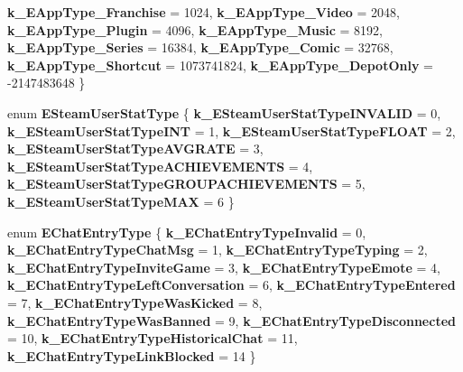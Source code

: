 \begin{DoxyCompactItemize}
{\bfseries k\+\_\+\+E\+App\+Type\+\_\+\+Franchise} = 1024, 
\newline
{\bfseries k\+\_\+\+E\+App\+Type\+\_\+\+Video} = 2048, 
{\bfseries k\+\_\+\+E\+App\+Type\+\_\+\+Plugin} = 4096, 
{\bfseries k\+\_\+\+E\+App\+Type\+\_\+\+Music} = 8192, 
{\bfseries k\+\_\+\+E\+App\+Type\+\_\+\+Series} = 16384, 
\newline
{\bfseries k\+\_\+\+E\+App\+Type\+\_\+\+Comic} = 32768, 
{\bfseries k\+\_\+\+E\+App\+Type\+\_\+\+Shortcut} = 1073741824, 
{\bfseries k\+\_\+\+E\+App\+Type\+\_\+\+Depot\+Only} = -\/2147483648
 \}
\item 
\mbox{\label{namespace_valve_1_1_steamworks_a15b38f5cd07e677a2e5bf2527fb6b562}} 
enum {\bfseries E\+Steam\+User\+Stat\+Type} \{ \newline
{\bfseries k\+\_\+\+E\+Steam\+User\+Stat\+Type\+I\+N\+V\+A\+L\+ID} = 0, 
{\bfseries k\+\_\+\+E\+Steam\+User\+Stat\+Type\+I\+NT} = 1, 
{\bfseries k\+\_\+\+E\+Steam\+User\+Stat\+Type\+F\+L\+O\+AT} = 2, 
{\bfseries k\+\_\+\+E\+Steam\+User\+Stat\+Type\+A\+V\+G\+R\+A\+TE} = 3, 
\newline
{\bfseries k\+\_\+\+E\+Steam\+User\+Stat\+Type\+A\+C\+H\+I\+E\+V\+E\+M\+E\+N\+TS} = 4, 
{\bfseries k\+\_\+\+E\+Steam\+User\+Stat\+Type\+G\+R\+O\+U\+P\+A\+C\+H\+I\+E\+V\+E\+M\+E\+N\+TS} = 5, 
{\bfseries k\+\_\+\+E\+Steam\+User\+Stat\+Type\+M\+AX} = 6
 \}
\item 
\mbox{\label{namespace_valve_1_1_steamworks_a4589b46bf69e3cd9f517767972692b2d}} 
enum {\bfseries E\+Chat\+Entry\+Type} \{ \newline
{\bfseries k\+\_\+\+E\+Chat\+Entry\+Type\+Invalid} = 0, 
{\bfseries k\+\_\+\+E\+Chat\+Entry\+Type\+Chat\+Msg} = 1, 
{\bfseries k\+\_\+\+E\+Chat\+Entry\+Type\+Typing} = 2, 
{\bfseries k\+\_\+\+E\+Chat\+Entry\+Type\+Invite\+Game} = 3, 
\newline
{\bfseries k\+\_\+\+E\+Chat\+Entry\+Type\+Emote} = 4, 
{\bfseries k\+\_\+\+E\+Chat\+Entry\+Type\+Left\+Conversation} = 6, 
{\bfseries k\+\_\+\+E\+Chat\+Entry\+Type\+Entered} = 7, 
{\bfseries k\+\_\+\+E\+Chat\+Entry\+Type\+Was\+Kicked} = 8, 
\newline
{\bfseries k\+\_\+\+E\+Chat\+Entry\+Type\+Was\+Banned} = 9, 
{\bfseries k\+\_\+\+E\+Chat\+Entry\+Type\+Disconnected} = 10, 
{\bfseries k\+\_\+\+E\+Chat\+Entry\+Type\+Historical\+Chat} = 11, 
{\bfseries k\+\_\+\+E\+Chat\+Entry\+Type\+Link\+Blocked} = 14
 \}
\item 

\end{DoxyCompactItemize}
